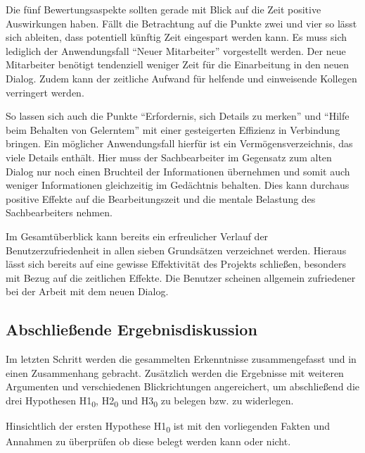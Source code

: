 Die fünf Bewertungsaspekte sollten gerade mit Blick auf die Zeit positive Auswirkungen haben. Fällt die Betrachtung auf die Punkte zwei und vier so lässt sich ableiten, dass potentiell künftig Zeit eingespart werden kann. Es muss sich lediglich der Anwendungsfall \enquote{Neuer Mitarbeiter} vorgestellt werden. Der neue Mitarbeiter benötigt tendenziell weniger Zeit für die Einarbeitung in den neuen Dialog. Zudem kann der zeitliche Aufwand für helfende und einweisende Kollegen verringert werden.

So lassen sich auch die Punkte \enquote{Erfordernis, sich Details zu merken} und \enquote{Hilfe beim Behalten von Gelerntem} mit einer gesteigerten Effizienz in Verbindung bringen. Ein möglicher Anwendungsfall hierfür ist ein Vermögensverzeichnis, das viele Details enthält. Hier muss der Sachbearbeiter im Gegensatz zum alten Dialog nur noch einen Bruchteil der Informationen übernehmen und somit auch weniger Informationen gleichzeitig im Gedächtnis behalten. Dies kann durchaus positive Effekte auf die Bearbeitungszeit und die mentale Belastung des Sachbearbeiters nehmen.

Im Gesamtüberblick kann bereits ein erfreulicher Verlauf der Benutzerzufriedenheit in allen sieben Grundsätzen verzeichnet werden. Hieraus lässt sich bereits auf eine gewisse Effektivität des Projekts schließen, besonders mit Bezug auf die zeitlichen Effekte. Die Benutzer scheinen allgemein zufriedener bei der Arbeit mit dem neuen Dialog.


\subsection{Abschließende Ergebnisdiskussion}
\label{sec:abschliessendeErgebnisdiskussion}
Im letzten Schritt werden die gesammelten Erkenntnisse zusammengefasst und in einen Zusammenhang gebracht. Zusätzlich werden die Ergebnisse mit weiteren Argumenten und verschiedenen Blickrichtungen angereichert, um abschließend die drei Hypothesen H1\textsubscript{0}, H2\textsubscript{0} und H3\textsubscript{0} zu belegen bzw. zu widerlegen.

Hinsichtlich der ersten Hypothese H1\textsubscript{0} ist mit den vorliegenden Fakten und Annahmen zu überprüfen ob diese belegt werden kann oder nicht. 